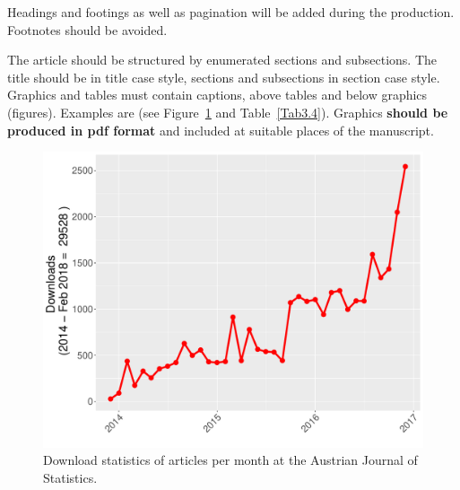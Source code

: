 \documentclass[article]{ajs}
\begin{document}
Headings and footings as well as pagination will be added during
the production. Footnotes should be avoided.

The article should be structured by enumerated sections and
subsections. The title should be in title case style, sections and subsections in section case style. Graphics and tables must contain captions, above
tables and below graphics (figures). Examples are (see Figure~\ref{fig:Fig3.4} and Table~\ref{Tab3.4}).
Graphics \textbf{should be produced in \textbf{pdf} format} and included 
 at suitable places of the manuscript. 

\begin{figure}[hbt]
\begin{center}
\includegraphics{ajs-download20180210}
\caption{\label{fig:Fig3.4}Download statistics of articles per month at the Austrian Journal of Statistics.}  
\end{center}
\end{figure}
\end{document}
